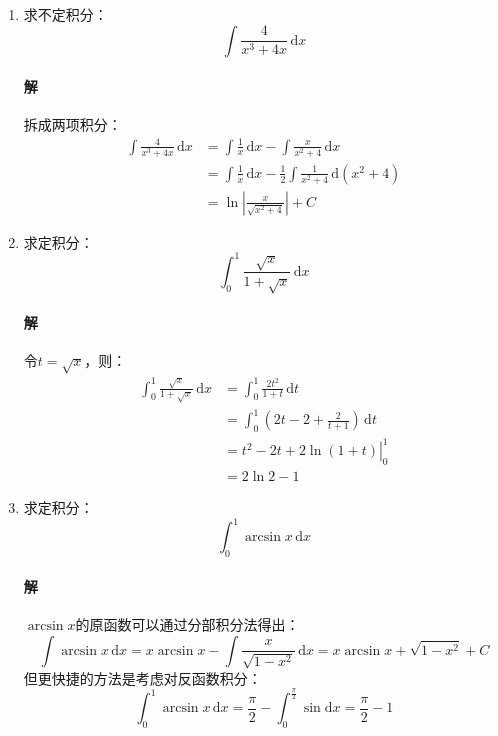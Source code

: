 \documentclass[fontset=none,openany,a4paper]{ctexbook}
\begin{document}
\begin{enumerate}
    \item 求不定积分：
    \[
    \int \frac{4}{x^3+4x}\,\mathrm{d}x
    \]

    \paragraph{解}

    拆成两项积分：
    \begin{align*}
        \int \frac{4}{x^3+4x}\,\mathrm{d}x
        &= \int \frac{1}{x}\,\mathrm{d}x - \int \frac{x}{x^2+4}\,\mathrm{d}x \\
        &= \int \frac{1}{x}\,\mathrm{d}x - \frac{1}{2}\int \frac{1}{x^2+4}\,\mathrm{d}(x^2+4) \\
        &= \ln\left|\frac{x}{\sqrt{x^2+4}}\right| + C
    \end{align*}

    \item 求定积分：
    \[
    \int_{0}^{1} \frac{\sqrt{x}}{1+\sqrt{x}}\,\mathrm{d}x
    \]

    \paragraph{解}

    令$t = \sqrt x$，则：
    \begin{align*}
        \int_{0}^{1} \frac{\sqrt{x}}{1+\sqrt{x}}\,\mathrm{d}x
        &= \int_{0}^{1} \frac{2t^2}{1+t}\,\mathrm{d}t \\
        &= \int_{0}^{1} \left(2t - 2 + \frac{2}{t+1}\right)\,\mathrm{d}t \\
        &= \left.t^2 - 2t + 2\ln(1+t)\right|_0^1 \\
        &= 2\ln2 - 1
    \end{align*}

    \item 求定积分：
    \[
    \int_{0}^{1} \arcsin x\,\mathrm{d}x
    \]

    \paragraph{解}

    $\arcsin x$的原函数可以通过分部积分法得出：
    \[
    \int \arcsin x\,\mathrm{d}x = x\arcsin x - \int \frac{x}{\sqrt{1-x^2}}\,\mathrm{d}x = x\arcsin x + \sqrt{1-x^2} + C
    \]
    但更快捷的方法是考虑对反函数积分：
    \[
    \int_{0}^{1} \arcsin x\,\mathrm{d}x = \frac{\pi}{2} - \int_0^\tfrac{\pi}{2} \sin\mathrm{d}x = \frac{\pi}{2} - 1
    \]


\end{enumerate}
\end{document}
